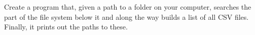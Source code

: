 Create a program that, given a path to a folder on your computer, searches the part of the file system below it and along the way builds a list of all CSV files. Finally, it prints out the paths to these.
